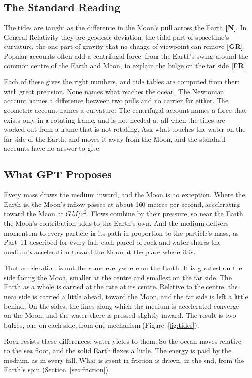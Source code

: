 \documentclass[11pt,a4paper]{article}
\newcommand{\reg}[1]{\textsf{\small\textbf{[#1]}}}
\newcommand{\RN}{\reg{N}}
\newcommand{\RGR}{\reg{GR}}
\newcommand{\RFR}{\reg{FR}}
\begin{document}
\subsection*{The Standard Reading}

The tides are taught as the difference in the Moon's pull across the Earth \RN{}. In General Relativity they are geodesic deviation, the tidal part of spacetime's curvature, the one part of gravity that no change of viewpoint can remove \RGR{}. Popular accounts often add a centrifugal force, from the Earth's swing around the common centre of the Earth and Moon, to explain the bulge on the far side \RFR{}.

Each of these gives the right numbers, and tide tables are computed from them with great precision. None names what reaches the ocean. The Newtonian account names a difference between two pulls and no carrier for either. The geometric account names a curvature. The centrifugal account names a force that exists only in a rotating frame, and is not needed at all when the tides are worked out from a frame that is not rotating. Ask what touches the water on the far side of the Earth, and moves it away from the Moon, and the standard accounts have no answer to give.

\subsection*{What GPT Proposes}

\begin{hypbar}
Every mass draws the medium inward, and the Moon is no exception.\footnotemark{} Where the Earth is, the Moon's inflow passes at about 160 metres per second, accelerating toward the Moon at $GM/r^2$. Flows combine by their pressure, so near the Earth the Moon's contribution adds to the Earth's own. And the medium delivers momentum to every particle in its path in proportion to the particle's mass, as Part~11 described for every fall: each parcel of rock and water shares the medium's acceleration toward the Moon at the place where it is.

That acceleration is not the same everywhere on the Earth. It is greatest on the side facing the Moon, smaller at the centre and smallest on the far side. The Earth as a whole is carried at the rate at its centre. Relative to the centre, the near side is carried a little ahead, toward the Moon, and the far side is left a little behind. On the sides, the lines along which the medium is accelerated converge on the Moon, and the water there is pressed slightly inward. The result is two bulges, one on each side, from one mechanism (Figure~\ref{fig:tides}).

Rock resists these differences; water yields to them. So the ocean moves relative to the sea floor, and the solid Earth flexes a little. The energy is paid by the medium, as in every fall. What is spent in friction is drawn, in the end, from the Earth's spin (Section~\ref{sec:friction}).
\end{hypbar}
\end{document}
